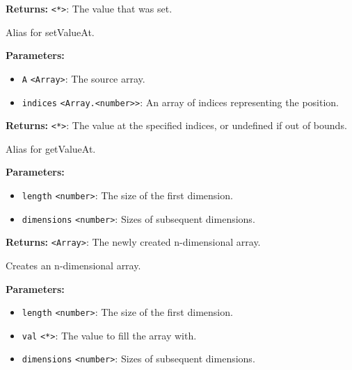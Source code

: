 \documentclass[12pt,a4paper]{article}
\begin{document}
\noindent \textbf{Returns:} \texttt{<*>}: The value that was set.

\noindent Alias for setValueAt.

\vspace{5mm}
\noindent {}


\noindent \textbf{Parameters:}
\begin{itemize}
  \item \texttt{A} \texttt{<Array>}: The source array.
  \item \texttt{indices} \texttt{<Array.<number>>}: An array of indices representing the position.
\end{itemize}

\noindent \textbf{Returns:} \texttt{<*>}: The value at the specified indices, or undefined if out of bounds.

\noindent Alias for getValueAt.

\vspace{5mm}
\noindent {}


\noindent \textbf{Parameters:}
\begin{itemize}
  \item \texttt{length} \texttt{<number>}: The size of the first dimension.
  \item \texttt{dimensions} \texttt{<number>}: Sizes of subsequent dimensions.
\end{itemize}

\noindent \textbf{Returns:} \texttt{<Array>}: The newly created n-dimensional array.

\noindent Creates an n-dimensional array.

\vspace{5mm}
\noindent {}


\noindent \textbf{Parameters:}
\begin{itemize}
  \item \texttt{length} \texttt{<number>}: The size of the first dimension.
  \item \texttt{val} \texttt{<*>}: The value to fill the array with.
  \item \texttt{dimensions} \texttt{<number>}: Sizes of subsequent dimensions.
\end{itemize}
\end{document}
